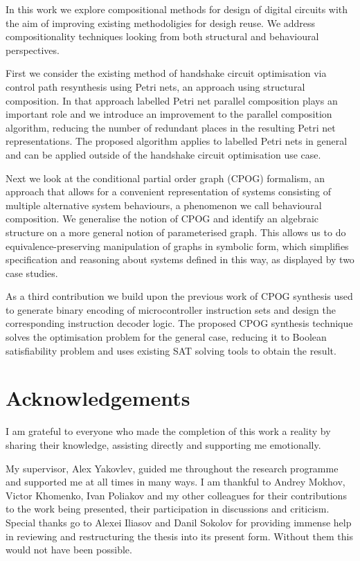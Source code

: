 \documentclass[12pt,english,british]{report}
\begin{document}
\tableofcontents

\listoffigures
\listoftables

\abstract
 
In this work we explore compositional methods for design of digital circuits with the aim of improving 
existing methodoligies for desigh reuse. We address compositionality techniques 
looking from both structural and behavioural perspectives.

First we consider the existing method of handshake circuit optimisation via control path 
resynthesis using Petri nets, an approach using structural composition. 
In that approach labelled Petri net parallel composition plays an important role
and we introduce an improvement to the parallel composition algorithm, reducing the number of redundant places in 
the resulting Petri net representations. The proposed algorithm applies to labelled Petri nets in general
and can be applied outside of the handshake circuit optimisation use case.

Next we look at the conditional partial order graph (CPOG) formalism, an approach that allows for a convenient representation of systems
consisting of multiple alternative system behaviours, a phenomenon we call behavioural composition.
We generalise the notion of CPOG and identify an algebraic structure on a more general notion of parameterised graph.
This allows us to do equivalence-preserving manipulation of graphs in symbolic form, which simplifies
specification and reasoning about systems defined in this way, as displayed by two case studies.

As a third contribution we build upon the previous work of CPOG synthesis used 
to generate binary encoding of microcontroller instruction sets and design the corresponding instruction decoder logic. 
The proposed CPOG synthesis technique solves the optimisation problem for the
general case, reducing it to Boolean satisfiability problem and uses existing 
SAT solving tools to obtain the result.


\chapter*{Acknowledgements}

I am grateful to everyone who made the completion of this work a reality by sharing their knowledge, assisting directly and supporting me emotionally.

My supervisor, Alex Yakovlev, guided me throughout the research programme and supported me at all times in many ways.
I am thankful to Andrey Mokhov, Victor Khomenko, Ivan Poliakov and my other colleagues for their contributions
to the work being presented, their participation in discussions and criticism.
Special thanks go to Alexei Iliasov and Danil Sokolov for providing immense help in reviewing 
and restructuring the thesis into its present form. Without them this would not have been possible.
\end{document}
